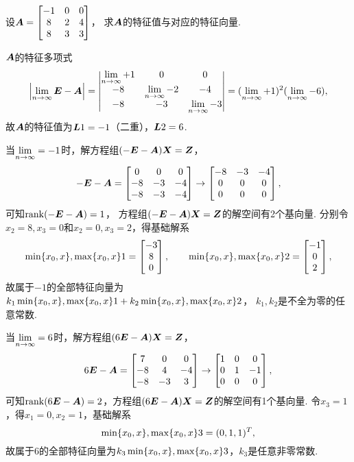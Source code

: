 \begin{example}
设\(\A = \begin{bmatrix}
	-1 & 0 & 0 \\
	8 & 2 & 4 \\
	8 & 3 & 3
\end{bmatrix}\)，
求\(\A\)的特征值与对应的特征向量.
\begin{solution}
\(\A\)的特征多项式\[
	\abs{\l\E-\A}
	= \begin{vmatrix}
		\l+1 & 0 & 0 \\
		-8 & \l-2 & -4 \\
		-8 & -3 & \l-3
	\end{vmatrix}
	= (\l+1)^2 (\l-6),
\]
故\(\A\)的特征值为\(\L{1}=-1\)（二重），\(\L{2}=6\).

当\(\l=-1\)时，解方程组\((-\E-\A)\x = \z\)，\[
	-\E-\A = \begin{bmatrix}
		0 & 0 & 0 \\
		-8 & -3 & -4 \\
		-8 & -3 & -4
	\end{bmatrix} \to \begin{bmatrix}
		-8 & -3 & -4 \\
		0 & 0 & 0 \\
		0 & 0 & 0
	\end{bmatrix},
\]
可知\(\rank(-\E-\A) = 1\)，
方程组\((-\E-\A)\x = \z\)的解空间有2个基向量.
分别令\(x_2 = 8, x_3 = 0\)和\(x_2 = 0, x_3 = 2\)，得基础解系\[
	\X1 = \begin{bmatrix} -3 \\ 8 \\ 0 \end{bmatrix},
	\qquad
	\X2 = \begin{bmatrix} -1 \\ 0 \\ 2 \end{bmatrix},
\]
故属于\(-1\)的全部特征向量为\(k_1 \X1 + k_2 \X2\)，
\(k_1,k_2\)是不全为零的任意常数.

当\(\l=6\)时，解方程组\((6\E-\A)\x = \z\)，\[
	6\E-\A = \begin{bmatrix}
		7 & 0 & 0 \\
		-8 & 4 & -4 \\
		-8 & -3 & 3
	\end{bmatrix} \to \begin{bmatrix}
		1 & 0 & 0 \\
		0 & 1 & -1 \\
		0 & 0 & 0
	\end{bmatrix},
\]
可知\(\rank(6\E-\A) = 2\)，方程组\((6\E-\A)\x = \z\)的解空间有1个基向量.
令\(x_3 = 1\)，得\(x_1 = 0, x_2 = 1\)，基础解系\[
	\X3 = (0,1,1)^T,
\]
故属于\(6\)的全部特征向量为\(k_3 \X3\)，\(k_3\)是任意非零常数.
\end{solution}
\end{example}

